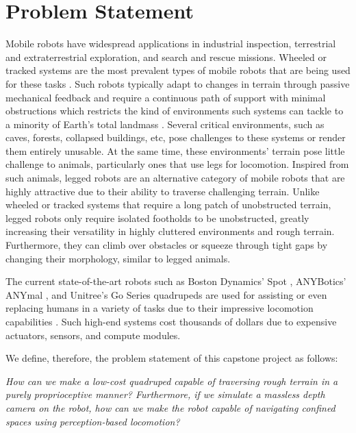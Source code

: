 \section{Problem Statement}

Mobile robots have widespread applications in industrial inspection, terrestrial and extraterrestrial exploration, and search and rescue missions. Wheeled or tracked systems are the most prevalent types of mobile robots that are being used for these tasks \cite{IntroductionAutonomousMobile}. Such robots typically adapt to changes in terrain through passive mechanical feedback \cite{belterAdaptiveMotionPlanning2016} and require a continuous path of support with minimal obstructions \cite{raibertLeggedRobotsThat1986} which restricts the kind of environments such systems can tackle to a minority of Earth's total landmass \cite{raibertBigDogRoughTerrainQuadruped2008}. Several critical environments, such as caves, forests, collapsed buildings, etc, pose challenges to these systems or render them entirely unusable. At the same time, these environments' terrain pose little challenge to animals, particularly ones that use legs for locomotion. Inspired from such animals, legged robots are an alternative category of mobile robots that are highly attractive due to their ability to traverse challenging terrain. Unlike wheeled or tracked systems that require a long patch of unobstructed terrain, legged robots only require isolated footholds to be unobstructed, greatly increasing their versatility in highly cluttered environments and rough terrain. Furthermore, they can climb over obstacles or squeeze through tight gaps by changing their morphology, similar to legged animals.

The current state-of-the-art robots such as Boston Dynamics' Spot \cite{Spot}, ANYBotics' ANYmal \cite{hutterANYmalHighlyMobile2016}, and Unitree's Go Series quadrupeds are used for assisting or even replacing humans in a variety of tasks due to their impressive locomotion capabilities \cite{SpotRescue, SpotRobotAssists, boumanAutonomousSpotLongRange2020, NovoNordiskExplores, gehringANYmalFieldSolving2021, tranzattoCERBERUSAutonomousLegged2022, hoellerANYmalParkourLearning2023, UnitreeFirefightingRobots2025}. Such high-end systems cost thousands of dollars \cite{kimPADWQDesignControl2021} due to expensive actuators, sensors, and compute modules.

We define, therefore, the problem statement of this capstone project as follows: 

\textit{How can we make a low-cost quadruped capable of traversing rough terrain in a purely proprioceptive manner? Furthermore, if we simulate a massless depth camera on the robot, how can we make the robot capable of navigating confined spaces using perception-based locomotion?}

